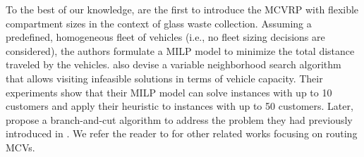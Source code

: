 \documentclass[11pt]{elsarticle}
\theoremstyle{plain}
\begin{document}
To the best of our knowledge, \cite{henke2015multi} are the first to introduce the \ac{MCVRP} with flexible compartment sizes in the context of glass waste collection. Assuming a predefined, homogeneous fleet of vehicles (i.e., no fleet sizing decisions are considered), the authors formulate a \ac{MILP} model to minimize the total distance traveled by the vehicles.
\cite{henke2015multi} also devise a variable neighborhood search algorithm that allows visiting infeasible solutions in terms of vehicle capacity. Their experiments show that their \ac{MILP} model can solve instances with up to 10 customers and apply their heuristic to instances with up to 50 customers. Later, \cite{henke2019branch} propose a branch-and-cut algorithm to address the problem they had previously introduced in \cite{henke2015multi}. We refer the reader to \cite{ostermeier2021multi} for other related works focusing on routing \acp{MCV}.
\end{document}
